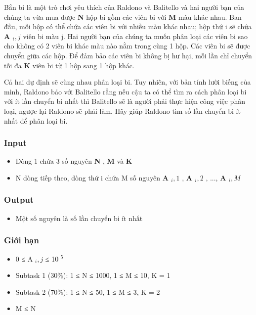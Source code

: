 



   Bắn bi là một trò chơi yêu thích của Raldono và Balitello và hai người bạn của chủng ta vừa mua được   \textbf{    N   }   hộp bi gồm các viên bi với   \textbf{    M   }   màu khác nhau. Ban đầu, mỗi hộp có thể chứa các viên bi với nhiều màu khác nhau; hộp thứ i sẽ chứa   \textbf{    A    $_     i, j    $}   viên bi màu j. Hai người bạn của chúng ta muốn phân loại các viên bi sao cho không có 2 viên bi khác màu nào nằm trong cùng 1 hộp. Các viên bi sẽ được chuyển giữa các hộp. Để đảm bảo các viên bi không bị hư hại, mỗi lần chỉ chuyển tối đa   \textbf{    K   }   viên bi từ 1 hộp sang 1 hộp khác.  

   Cả hai dự định sẽ cùng nhau phân loại bi. Tuy nhiên, với bản tính lười biếng của mình, Raldono bảo với Balitello rằng nếu cậu ta có thể tìm ra cách phân loại bi với ít lần chuyển bi nhất thì Balitello sẽ là người phải thực hiện công việc phân loại, ngược lại Raldono sẽ phải làm. Hãy giúp Raldono tìm số lần chuyển bi ít nhất để phân loại bi.  

\subsubsection{   Input  }
\begin{itemize}
	\item     Dòng 1 chứa 3 số nguyên    \textbf{     N    }    ,    \textbf{     M    }    và    \textbf{     K    }
	\item     N dòng tiếp theo, dòng thứ i chứa M số nguyên    \textbf{     A     $_      i, 1     $}    ,    \textbf{     A     $_      i,2     $}    , ...,    \textbf{     A     $_      i,M     $}
\end{itemize}

\subsubsection{   Output  }
\begin{itemize}
	\item     Một số nguyên là số lần chuyển bi ít nhất   
\end{itemize}

\subsubsection{   Giới hạn  }
\begin{itemize}
	\item     0 ≤ A    $_     i, j    $    ≤ 10    $^     5    $
	\item     Subtask 1 (30\%): 1 ≤ N ≤ 1000, 1 ≤ M ≤ 10, K = 1   
	\item     Subtask 2 (70\%): 1 ≤ N ≤ 50, 1 ≤ M ≤ 3, K = 2   
	\item     M ≤ N   
\end{itemize}

